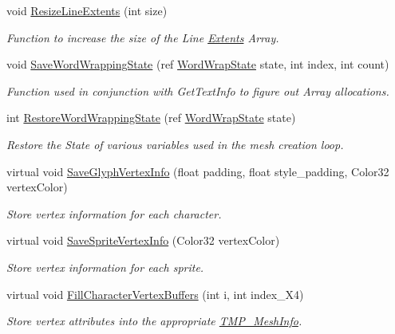 \begin{DoxyCompactItemize}
void \mbox{\hyperlink{class_t_m_pro_1_1_t_m_p___text_ab4057d4bf48b3f95e69bd3146a9fc50e}{Resize\+Line\+Extents}} (int size)
\begin{DoxyCompactList}\small\item\em Function to increase the size of the Line \mbox{\hyperlink{struct_t_m_pro_1_1_extents}{Extents}} Array. \end{DoxyCompactList}\item 
void \mbox{\hyperlink{class_t_m_pro_1_1_t_m_p___text_af4575fb91d41221be3bd2764a356eda1}{Save\+Word\+Wrapping\+State}} (ref \mbox{\hyperlink{struct_t_m_pro_1_1_word_wrap_state}{Word\+Wrap\+State}} state, int index, int count)
\begin{DoxyCompactList}\small\item\em Function used in conjunction with Get\+Text\+Info to figure out Array allocations. \end{DoxyCompactList}\item 
int \mbox{\hyperlink{class_t_m_pro_1_1_t_m_p___text_a0555e7043aed6e3db5ef6113eac2fa77}{Restore\+Word\+Wrapping\+State}} (ref \mbox{\hyperlink{struct_t_m_pro_1_1_word_wrap_state}{Word\+Wrap\+State}} state)
\begin{DoxyCompactList}\small\item\em Restore the State of various variables used in the mesh creation loop. \end{DoxyCompactList}\item 
virtual void \mbox{\hyperlink{class_t_m_pro_1_1_t_m_p___text_ac62ca7572491147ae78efdbbab12c953}{Save\+Glyph\+Vertex\+Info}} (float padding, float style\+\_\+padding, Color32 vertex\+Color)
\begin{DoxyCompactList}\small\item\em Store vertex information for each character. \end{DoxyCompactList}\item 
virtual void \mbox{\hyperlink{class_t_m_pro_1_1_t_m_p___text_ab4339f4e5cc87fd75ef8a52106ede97e}{Save\+Sprite\+Vertex\+Info}} (Color32 vertex\+Color)
\begin{DoxyCompactList}\small\item\em Store vertex information for each sprite. \end{DoxyCompactList}\item 
virtual void \mbox{\hyperlink{class_t_m_pro_1_1_t_m_p___text_a08f26a6f0ccce1042dc32f8a392f4c25}{Fill\+Character\+Vertex\+Buffers}} (int i, int index\+\_\+\+X4)
\begin{DoxyCompactList}\small\item\em Store vertex attributes into the appropriate \mbox{\hyperlink{struct_t_m_pro_1_1_t_m_p___mesh_info}{T\+M\+P\+\_\+\+Mesh\+Info}}. \end{DoxyCompactList}\item 

\end{DoxyCompactItemize}
